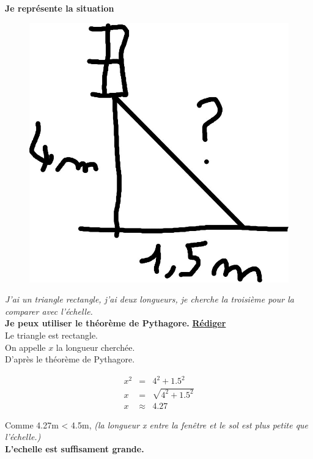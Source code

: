 \documentclass[12pt]{article}
\begin{document}
\begin{multicols}{2}

	\textbf{Je représente la situation}

	\begin{figure}[H]
		\centering
		\includegraphics[width=0.5\linewidth]{4x1-pythagore/sources/probleme.jpg}
	\end{figure}

	\textit{J'ai un triangle rectangle, j'ai deux longueurs, je cherche la troisième pour la comparer avec l'échelle.}\\
	\textbf{Je peux utiliser le théorème de Pythagore.}
	\vspace{1cm}
	\underline{\textbf{Rédiger}}\\
	Le triangle est rectangle.\\
	On appelle $x$ la longueur cherchée.\\
	D'après le théorème de Pythagore.

	\begin{eqnarray*}
		x^2 &=& 4^2 + 1.5^2 \\
		x   &=& \sqrt{4^2 + 1.5^2} \\
		x   &\approx& 4.27
	\end{eqnarray*}

	Comme 4.27m < 4.5m, \textit{(la longueur x entre la fenêtre et le sol est plus petite que l'échelle.)}\\
	\textbf{L'echelle est suffisament grande.}
\end{multicols}
\end{document}
